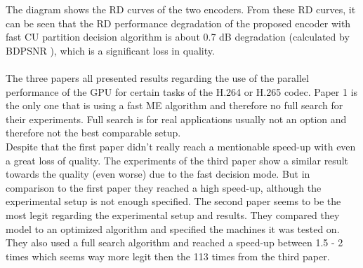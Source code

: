 The diagram shows the RD curves of the two encoders. From these RD curves, it can be seen that the RD performance degradation of the proposed
encoder with fast CU partition decision algorithm is about
0.7 dB degradation (calculated by BDPSNR \cite{bjontegaard}), which is a significant loss in quality.\\
\\
The three papers all presented results regarding the use of the parallel performance of the GPU for certain tasks of the H.264 or H.265 codec. Paper 1 is the only one that is using a fast ME algorithm and therefore no full search for their experiments. Full search is for real applications usually not an option and therefore not the best comparable setup.\\
Despite that the first paper didn't really reach a mentionable speed-up with even a great loss of quality. The experiments of the third paper show a similar result towards the quality (even worse) due to the fast decision mode. But in comparison to the first paper they reached a high speed-up, although the experimental setup is not enough specified. The second paper seems to be the most legit regarding the experimental setup and results. They compared they model to an optimized algorithm and specified the machines it was tested on. They also used a full search algorithm and reached a speed-up between 1.5 - 2 times which seems way more legit then the 113 times from the third paper. 